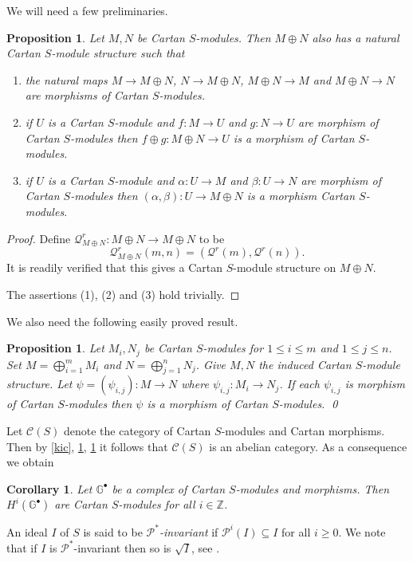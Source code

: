 \documentclass{amsart}
\newcommand{\C}{\mathcal{C} }
\newcommand{\Z}{\mathbb{Z} }
\newcommand{\Pc}{\mathcal{P} }
\newcommand{\Qc}{\mathcal{Q} }
\newcommand{\rt}{\rightarrow}
\newcommand{\G}{\mathbb{G}^\bullet }
\theoremstyle{plain}
\newtheorem{corollary}[theorem]{Corollary}
\newtheorem{proposition}[theorem]{Proposition}
\theoremstyle{definition}
\theoremstyle{remark}
\begin{document}
We will need a few preliminaries.
\begin{proposition}\label{add}
Let $M, N$ be Cartan $S$-modules. Then $M \oplus N$  also has a natural Cartan $S$-module structure such that
\begin{enumerate}[\rm (1)]
  \item the natural maps $M \rt M\oplus N$, $N \rt M\oplus N$, $M\oplus N \rt M$ and $M\oplus N \rt N$ are morphisms of Cartan $S$-modules.
  \item if $U$ is a Cartan $S$-module and $f\colon M \rt U$ and $g \colon N\rt U$ are morphism of Cartan $S$-modules then $f\oplus g \colon M\oplus N \rt U$ is a morphism of Cartan $S$-modules.
  \item if $U$ is a Cartan $S$-module  and $\alpha \colon U \rt M$ and $\beta \colon U \rt N$ are morphism of Cartan $S$-modules then $(\alpha, \beta) \colon  U \rt M\oplus N$ is a morphism Cartan $S$-modules.
\end{enumerate}
\end{proposition}
\begin{proof}
Define $\Qc^r_{M\oplus N} \colon M\oplus N \rt M\oplus N$ to be
$$\Qc^r_{M\oplus N}(m, n) = (\Qc^r(m), \Qc^r(n)).$$
It is readily verified that this gives a Cartan $S$-module structure on $M\oplus N$.

The assertions (1), (2) and (3) hold trivially.
\end{proof}
We also need the following easily proved result.
\begin{proposition}\label{map-add}
Let $M_i, N_j$ be Cartan $S$-modules for $1 \leq i \leq m$ and $1\leq j \leq n$. Set $M = \bigoplus_{i = 1}^{m}M_i$ and $N = \bigoplus_{j = 1}^{n}N_j$. Give $M, N$ the induced Cartan $S$-module structure. Let $\psi = (\psi_{i,j})\colon M \rt N$ where $\psi_{i,j} \colon M_i \rt N_j$. If each $\psi_{i,j}$ is morphism of Cartan $S$-modules then $\psi$ is a morphism of Cartan $S$-modules. \qed
\end{proposition}
\s Let $\C(S)$ denote the category of Cartan $S$-modules and Cartan morphisms. Then by \ref{kic}, \ref{add}, \ref{map-add} it follows that $\C(S)$ is an abelian category.
As a consequence we obtain
\begin{corollary}
\label{complex-cart} Let $\G $ be a complex of Cartan $S$-modules and morphisms.  Then $H^i(\G)$ are  Cartan $S$-modules for all $i \in \Z$.
\end{corollary}

\s \label{cleo} An ideal $I$ of $S$ is said to be \emph{$\Pc^*$-invariant} if $\Pc^i(I)\subseteq I$ for all $i \geq 0$. We note that if $I$ is $\Pc^*$-invariant then so is $\sqrt{I}$, see \cite[11.2.5]{SL}.
\end{document}
